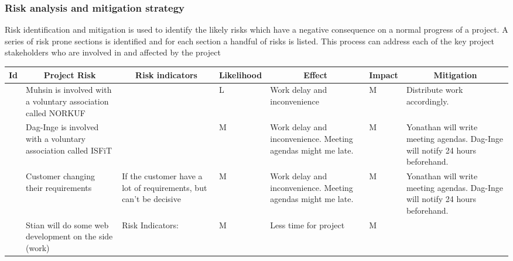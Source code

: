 \begin{landscape}

\subsubsection{Risk analysis and mitigation strategy}
Risk identification and mitigation is used to identify the likely risks which have a negative consequence on a normal progress of a project. A series of risk prone sections is identified and for each section a handful of risks is listed.  This process can address each of the key project stakeholders who are involved in and affected by the project	
\centering
\begin{longtable}{| p{0.4cm} | p{4cm} | p{4cm} | p{2cm} | p{4cm} | p{1cm} | p{4cm} |}
	\hline
		\multicolumn{1}{|c|}{ Id}   &
        \multicolumn{1}{c|}{ Project Risk}  &
		\multicolumn{1}{c|}{ Risk indicators}  &
		\multicolumn{1}{c|}{ Likelihood} &
		\multicolumn{1}{c|}{ Effect} &
		\multicolumn{1}{c|}{ Impact} &
		\multicolumn{1}{c|}{ Mitigation} \\
		\hline \hline
	\endhead

	\newcounter{riskId}

	\stepcounter{riskId}
	\centering
		\arabic{riskId} &
        Muhsin is involved with a voluntary association called NORKUF &
		&
		\centering L &
		Work delay and inconvenience &
		\centering M &
		Distribute work accordingly. \\
	\hline

	\stepcounter{riskId}
	\centering
		\arabic{riskId} &
        Dag-Inge is involved with a voluntary association called ISFiT &
		& \centering M &
		Work delay and inconvenience. Meeting agendas might me late. &
		\centering  M &
		Yonathan will write meeting agendas. Dag-Inge will notify 24 hours beforehand. \\
	\hline

	\stepcounter{riskId}
	\centering
		\arabic{riskId} &
        Customer changing their requirements &
		If the customer have a lot of requirements, but can’t be decisive &
		\centering M &
		Work delay and inconvenience. Meeting agendas might me late. &
		\centering  M &
		Yonathan will write meeting agendas. Dag-Inge will notify 24 hours beforehand. \\
	\hline

	\stepcounter{riskId}
	\centering
		\arabic{riskId} &
        Stian will do some web development on the side (work) &
		Risk Indicators: &
		\centering M &
		Less time for project &
		\centering M & \\
	\hline


\end{longtable}
\end{landscape}
